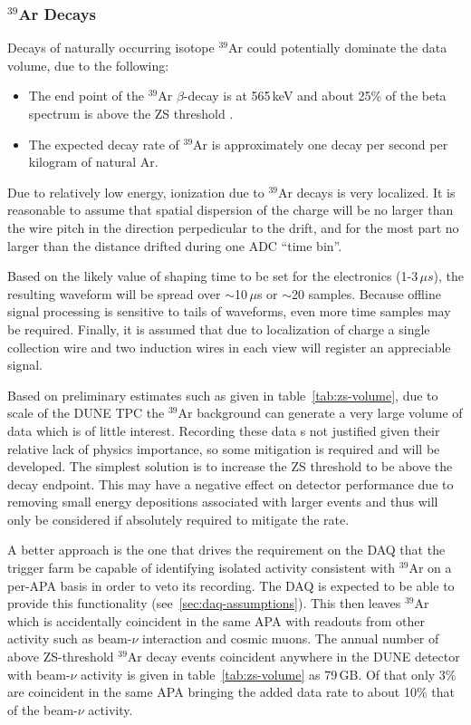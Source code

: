 \subsubsection{$^{39}$Ar Decays}
\label{sec:ar39decays}
Decays of naturally occurring isotope $^{39}$Ar could potentially dominate the data volume,
due to the following:
\begin{itemize}
\item The end point of the $^{39}$Ar $\beta$-decay is at 565\,keV and about
25\% of the beta spectrum is above the ZS threshold \cite{ar39endpoint}.

\item The expected decay rate of $^{39}$Ar is approximately one decay per second per kilogram of natural Ar\cite{ar39bkg}.
\end{itemize}
\noindent
Due to relatively low energy, ionization due to $^{39}$Ar decays is very localized.
It is reasonable to assume that spatial dispersion of the charge will be no larger than the wire pitch
in the direction perpedicular to the drift, and for the most part no larger than the distance drifted
during one ADC ``time bin''.

Based on the likely value of shaping time to be set for the electronics (1-3\,${\mu}s$),
the resulting waveform will be spread over $\sim$10\,$\mu$s or $\sim$20 samples. Because offline signal
processing is sensitive to tails of waveforms, even more time samples may be required.
Finally, it is assumed that due to localization of charge a single collection wire and two induction
wires in each view will register an appreciable signal.

Based on preliminary estimates such as given in table~\ref{tab:zs-volume},
due to scale of the DUNE TPC the $^{39}$Ar background can generate a very large volume
of data which is of little interest. Recording these data s not justified given their relative lack
of physics importance, so some mitigation is required and will be developed. The simplest solution
is to increase the ZS threshold to be above the decay endpoint.
This may have a negative effect on detector performance due to removing small energy
depositions associated with larger events and thus will only be
considered if absolutely required to mitigate the rate.

A better approach is the one that drives the requirement on the DAQ
that the trigger farm be capable of identifying isolated activity
consistent with $^{39}$Ar on a per-APA basis in order to veto its
recording. The DAQ is expected to be able to provide this functionality
(see~\ref{sec:daq-assumptions}).
This then leaves $^{39}$Ar which is accidentally coincident in the
same APA with readouts from other activity such as beam-$\nu$
interaction and cosmic muons.
The annual number of above ZS-threshold $^{39}$Ar decay events
coincident anywhere in the DUNE detector with beam-$\nu$ activity is
given in table~\ref{tab:zs-volume} as 79\,GB. Of that only 3\% are coincident
in the same APA bringing the added data rate to about 10\% that of the beam-$\nu$ activity.

